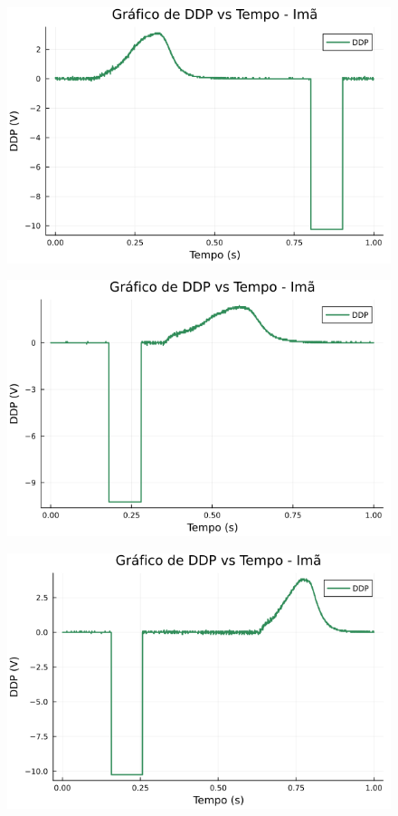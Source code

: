 \begin{center}
\begin{multicols}{2}
\begin{figure}[H]
    \centering
    \includegraphics[width=1.0\linewidth]{figuras/grafico_dados1_F0007CH1.png}
\end{figure}

\begin{figure}[H]
    \centering
    \includegraphics[width=1.0\linewidth]{figuras/grafico_dados1_F0008CH1.png}
\end{figure}

\begin{figure}[H]
    \centering
    \includegraphics[width=1.0\linewidth]{figuras/grafico_dados1_F0009CH1.png}
\end{figure}


\end{multicols}
\end{center}
